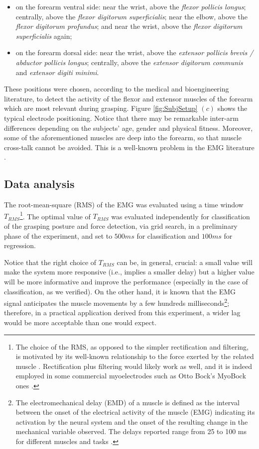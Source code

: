 \documentclass[10pt]{bmc_article}
\newenvironment{bmcformat}
  {\begin{raggedright}\baselineskip20pt\sloppy\setboolean{publ}{false}}
  {\end{raggedright}\baselineskip20pt\sloppy}
\begin{document}
\begin{bmcformat}
\begin{itemize}
  \item on the forearm ventral side: near the wrist, above the
    \emph{flexor pollicis longus}; centrally, above the \emph{flexor
    digitorum superficialis}; near the elbow, above the \emph{flexor
    digitorum profundus}; and near the wrist, above the \emph{flexor
    digitorum superficialis} again;

  \item on the forearm dorsal side: near the wrist, above the
    \emph{extensor pollicis brevis / abductor pollicis longus};
    centrally, above the \emph{extensor digitorum communis} and
    \emph{extensor digiti minimi}.

\end{itemize}

These positions were chosen, according to the medical \cite{Kendall} and
bioengineering \cite{kampas} literature, to detect the activity of the flexor
and extensor muscles of the forearm which are most relevant during grasping.
Figure \ref{fig:SubjSetup} $(c)$ shows
the typical electrode positioning. Notice that there may be remarkable
inter-arm differences depending on the subjects' age, gender and physical
fitness. Moreover, some of the aforementioned muscles are deep into
the forearm, so that muscle cross-talk cannot be avoided. This is a
well-known problem in the EMG literature \cite{deluca97,zecca}.

\subsection*{Data analysis}

The root-mean-square (RMS) of the EMG was evaluated using a time window
$T_{RMS}$\footnote{The choice of the RMS, as opposed
to the simpler rectification and filtering,
is motivated by its well-known relationship to the force exerted
by the related muscle \cite{deluca97,deluca02,zecca}. Rectification plus filtering
would likely work as well, and it is indeed employed in some commercial myoelectrodes
such as Otto Bock's MyoBock ones \cite{ottobock}.}. The optimal value
of $T_{RMS}$ was evaluated independently for classification of the grasping
posture and force detection, via grid search, in a preliminary phase of the
experiment, and set to $500ms$ for classification and $100ms$ for regression.

Notice that the right choice of $T_{RMS}$ can be, in general,
crucial: a small value will make the system more responsive (i.e., implies
a smaller delay) but a higher value will be more informative and improve the
performance (especially in the case of classification, as we verified).
On the other hand, it is known that the EMG signal anticipates the muscle
movements by a few hundreds milliseconds\footnote{The
electromechanical delay (EMD) of a muscle is defined as the interval
between the onset of the electrical activity of the muscle (EMG)
indicating its activation by the neural system and the onset of the
resulting change in the mechanical variable observed. The delays
reported range from 25 to 100 ms for different muscles and tasks
\cite{Wolf1994}.}; therefore, in a practical application derived from this
experiment, a wider lag would be more acceptable than one would expect.


\end{bmcformat}
\end{document}
